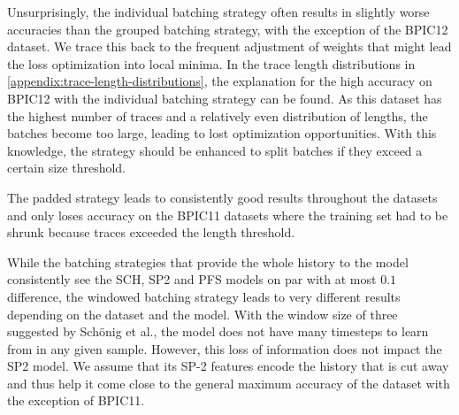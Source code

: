 Unsurprisingly, the individual batching strategy often results in slightly worse accuracies than the grouped batching strategy, with the exception of the BPIC12 dataset. We trace this back to the frequent adjustment of weights that might lead the loss optimization into local minima. In the trace length distributions in \autoref{appendix:trace-length-distributions}, the explanation for the high accuracy on BPIC12 with the individual batching strategy can be found. As this dataset has the highest number of traces and a relatively even distribution of lengths, the batches become too large, leading to lost optimization opportunities. With this knowledge, the strategy should be enhanced to split batches if they exceed a certain size threshold.

The padded strategy leads to consistently good results throughout the datasets and only loses accuracy on the BPIC11 datasets where the training set had to be shrunk because traces exceeded the length threshold.

While the batching strategies that provide the whole history to the model consistently see the SCH, SP2 and PFS models on par with at most $0.1$ difference, the windowed batching strategy leads to very different results depending on the dataset and the model. With the window size of three suggested by Schönig et al., the model does not have many timesteps to learn from in any given sample. However, this loss of information does not impact the SP2 model. We assume that its SP-2 features encode the history that is cut away and thus help it come close to the general maximum accuracy of the dataset with the exception of BPIC11.

